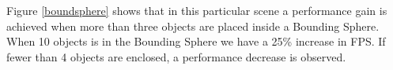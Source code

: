 			Figure \ref{boundsphere} shows that in this particular scene a performance gain is 
			achieved when more than three objects are placed inside a Bounding Sphere. 
			When 10 objects is in the Bounding Sphere we have a 25\% increase in FPS.  If
			fewer than 4 objects are enclosed, a performance decrease is 
			observed. 
